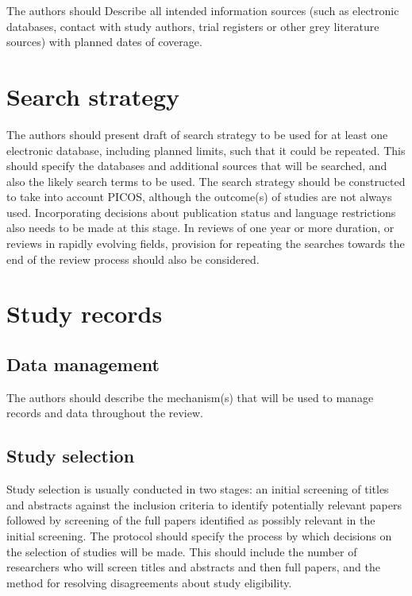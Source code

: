 \documentclass[
  11pt,
  a4paper,
  DIV=11,
  numbers=noendperiod]{scrreprt}
\begin{document}
The authors should Describe all intended information sources (such as
electronic databases, contact with study authors, trial registers or
other grey literature sources) with planned dates of coverage.

\section{Search strategy}\label{search-strategy}

The authors should present draft of search strategy to be used for at
least one electronic database, including planned limits, such that it
could be repeated. This should specify the databases and additional
sources that will be searched, and also the likely search terms to be
used. The search strategy should be constructed to take into account
PICOS, although the outcome(s) of studies are not always used.
Incorporating decisions about publication status and language
restrictions also needs to be made at this stage. In reviews of one year
or more duration, or reviews in rapidly evolving fields, provision for
repeating the searches towards the end of the review process should also
be considered.

\section{Study records}\label{study-records}

\subsection{Data management}\label{data-management}

The authors should describe the mechanism(s) that will be used to manage
records and data throughout the review.

\subsection{Study selection}\label{study-selection}

Study selection is usually conducted in two stages: an initial screening
of titles and abstracts against the inclusion criteria to identify
potentially relevant papers followed by screening of the full papers
identified as possibly relevant in the initial screening. The protocol
should specify the process by which decisions on the selection of
studies will be made. This should include the number of researchers who
will screen titles and abstracts and then full papers, and the method
for resolving disagreements about study eligibility.
\end{document}
